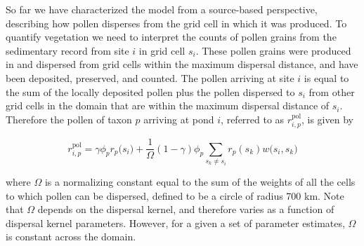 \documentclass[12pt]{article}
\begin{document}
So far we have characterized the model from a source-based
perspective, describing how pollen disperses from the grid cell in
which it was produced. To quantify vegetation we need to interpret the
counts of pollen grains from the sedimentary record from site $i$ in
grid cell $s_{i}$. These pollen grains were produced in and dispersed
from grid cells within the maximum dispersal distance, and have been
deposited, preserved, and counted. The pollen arriving at site $i$ is
equal to the sum of the locally deposited pollen plus the pollen
dispersed to $s_i$ from other grid cells in the domain that are within
the maximum dispersal distance of $s_i$. Therefore the pollen of taxon
$p$ arriving at pond $i$, referred to as $r_{i,p}^{\text{pol}}$, is
given by
\begin{linenomath*}
\begin{equation}
r_{i,p}^{\text{pol}} = \gamma \phi_p r_p\bigl(s_i\bigr) + \frac{1}{\Omega} (1-\gamma) \phi_p \sum_{s_k \neq s_i } r_p(s_k) w\bigl(s_i, s_k\bigr)
\label{eq:arriving}
\end{equation}
\end{linenomath*}
where $\Omega$ is a normalizing constant equal to the sum of the
weights of all the cells to which pollen can be dispersed, defined to
be a circle of radius 700 km. Note that $\Omega$ depends on the
dispersal kernel, and therefore varies as a function of dispersal
kernel parameters. However, for a given a set of parameter estimates,
$\Omega$ is constant across the domain.
\end{document}
